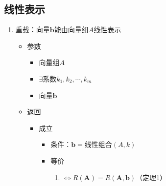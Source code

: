 \documentclass[UTF8,a4paper,12pt,scheme=chinese]{ctexbook}
\begin{document}
	\subsection{线性表示}
	\begin{enumerate}
		\item 重载：向量$\boldsymbol{b}$能由向量组$A$线性表示
		\begin{itemize}
			\item 参数
			\begin{itemize}
				\item 向量组$A$
				\item $\exists$系数$k_1,k_2,\dotsb,k_m$
				\item 向量$\boldsymbol{b}$
			\end{itemize}
			\item 返回
			\begin{itemize}
				\item 成立
				\begin{itemize}
					\item 条件：$\boldsymbol{b}=$线性组合$(A,k)$
					\item 等价
					\begin{enumerate}
						\item $\Leftrightarrow R(\boldsymbol{A})=R(\boldsymbol{A},\boldsymbol{b})$（定理1）
					\end{enumerate}
				\end{itemize}
				

\end{itemize}
\end{itemize}
\end{enumerate}
\end{document}
